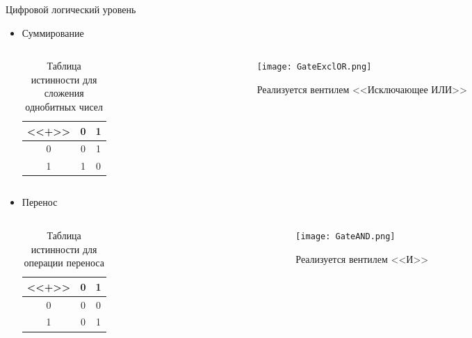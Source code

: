 \documentclass[aspectratio=169,14pt]{beamer}
\begin{document}
\begin{frame}{Цифровой логический уровень}
    \begin{itemize}
        \item Суммирование
        \begin{columns}[T,onlytextwidth]
            \begin{column}{0.5\textwidth}
                \begin{table}
                    \centering
                    \begin{tabular}{c|cc}
                        \textbf{<<+>>} & 0 & 1 \\ \hline
                        0 & 0 & 1 \\
                        1 & 1 & 0
                    \end{tabular}
                    \caption{\tiny{Таблица истинности для сложения однобитных чисел}}
                \end{table}
            \end{column}
            \begin{column}{0.5\textwidth}
                \begin{figure}[htp]
                    \centering
                    \texttt{[image: GateExclOR.png]}
                    \caption{\tiny{Реализуется вентилем <<Исключающее ИЛИ>>}}
                \end{figure}
            \end{column}
        \end{columns}
        \item Перенос
        \begin{columns}[T,onlytextwidth]
            \begin{column}{0.5\textwidth}
                \begin{table}
                    \centering
                    \begin{tabular}{c|cc}
                        \textbf{<<+>>} & 0 & 1 \\ \hline
                        0 & 0 & 0 \\
                        1 & 0 & 1
                    \end{tabular}
                    \caption{\tiny{Таблица истинности для операции переноса}}
                \end{table}
            \end{column}
            \begin{column}{0.5\textwidth}
                \begin{figure}[htp]
                    \centering
                    \texttt{[image: GateAND.png]}
                    \caption{\tiny{Реализуется вентилем <<И>>}}
                \end{figure}
            \end{column}
        \end{columns}
    \end{itemize}
\end{frame}
\end{document}
